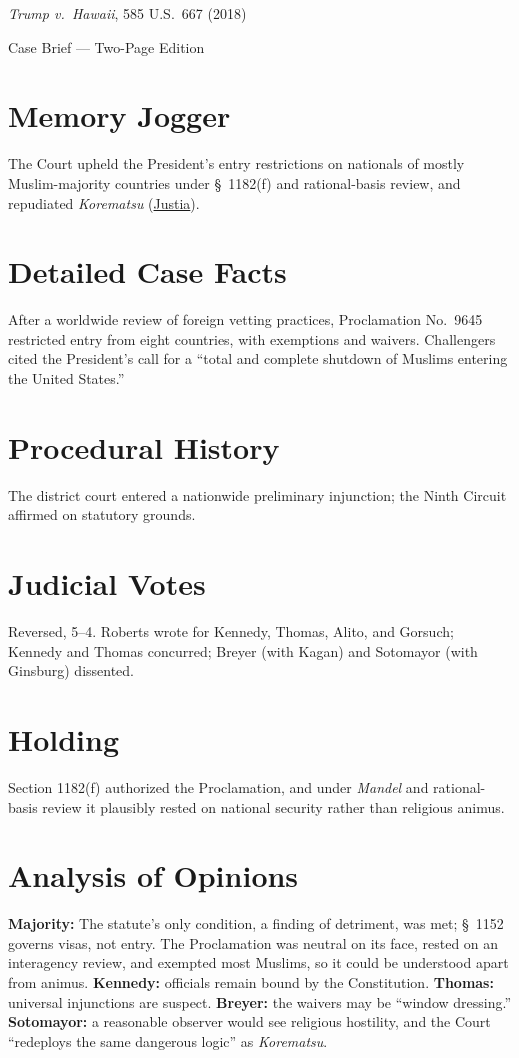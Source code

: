 \documentclass[12pt]{article}
\begin{document}
\begin{center}
{\LARGE \textit{Trump v.\ Hawaii}, 585 U.S.\ 667 (2018)\par}
\vspace{0.5em}
{\large Case Brief --- Two-Page Edition\par}
\end{center}

\section{Memory Jogger}
The Court upheld the President's entry restrictions on nationals of mostly Muslim-majority countries under \S~1182(f) and rational-basis review, and repudiated \textit{Korematsu} (\href{https://supreme.justia.com/cases/federal/us/585/17-965/}{Justia}).

\section{Detailed Case Facts}
After a worldwide review of foreign vetting practices, Proclamation No.~9645 restricted entry from eight countries, with exemptions and waivers. Challengers cited the President's call for a ``total and complete shutdown of Muslims entering the United States.''

\section{Procedural History}
The district court entered a nationwide preliminary injunction; the Ninth Circuit affirmed on statutory grounds.

\section{Judicial Votes}
Reversed, 5--4. Roberts wrote for Kennedy, Thomas, Alito, and Gorsuch; Kennedy and Thomas concurred; Breyer (with Kagan) and Sotomayor (with Ginsburg) dissented.

\section{Holding}
Section 1182(f) authorized the Proclamation, and under \textit{Mandel} and rational-basis review it plausibly rested on national security rather than religious animus.

\section{Analysis of Opinions}
\textbf{Majority:} The statute's only condition, a finding of detriment, was met; \S~1152 governs visas, not entry. The Proclamation was neutral on its face, rested on an interagency review, and exempted most Muslims, so it could be understood apart from animus. \textbf{Kennedy:} officials remain bound by the Constitution. \textbf{Thomas:} universal injunctions are suspect. \textbf{Breyer:} the waivers may be ``window dressing.'' \textbf{Sotomayor:} a reasonable observer would see religious hostility, and the Court ``redeploys the same dangerous logic'' as \textit{Korematsu}.
\end{document}

